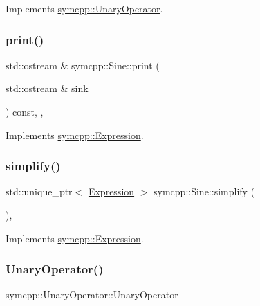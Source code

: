 Implements \mbox{\hyperlink{classsymcpp_1_1UnaryOperator_a85de3214870cd72edc63ac1c221ddeee}{symcpp\+::\+Unary\+Operator}}.

\mbox{\label{classsymcpp_1_1Sine_ad3680056460c4990115a23427ea723fe}} 
\subsubsection{\texorpdfstring{print()}{print()}}
{\footnotesize\ttfamily std\+::ostream \& symcpp\+::\+Sine\+::print (\begin{DoxyParamCaption}\item[{std\+::ostream \&}]{sink }\end{DoxyParamCaption}) const\hspace{0.3cm}{\ttfamily [override]}, {\ttfamily [private]}, {\ttfamily [virtual]}}



Implements \mbox{\hyperlink{classsymcpp_1_1Expression_af37e13032a40f2da4d2866eaa8658049}{symcpp\+::\+Expression}}.

\mbox{\label{classsymcpp_1_1Sine_a3cac7091905da6765a019a0ece9e45d5}} 
\subsubsection{\texorpdfstring{simplify()}{simplify()}}
{\footnotesize\ttfamily std\+::unique\+\_\+ptr$<$ \mbox{\hyperlink{classsymcpp_1_1Expression}{Expression}} $>$ symcpp\+::\+Sine\+::simplify (\begin{DoxyParamCaption}{ }\end{DoxyParamCaption})\hspace{0.3cm}{\ttfamily [override]}, {\ttfamily [virtual]}}



Implements \mbox{\hyperlink{classsymcpp_1_1Expression_ab1fa6e55eea0682250d013f28db26cd2}{symcpp\+::\+Expression}}.

\mbox{\label{classsymcpp_1_1Sine_ad3aa899567a080eeb41cb850de310178}} 
\subsubsection{\texorpdfstring{UnaryOperator()}{UnaryOperator()}\hspace{0.1cm}{\footnotesize\ttfamily [1/2]}}
{\footnotesize\ttfamily symcpp\+::\+Unary\+Operator\+::\+Unary\+Operator\hspace{0.3cm}{\ttfamily [inline]}}


